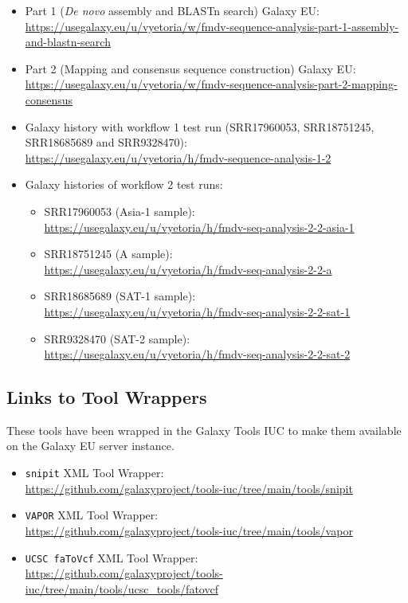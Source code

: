 \begin{itemize}
	\setlength{\itemsep}{-0.4cm}
	\item Part 1 (\textit{De novo} assembly and BLASTn search) Galaxy EU:\\
	\url{https://usegalaxy.eu/u/vyetoria/w/fmdv-sequence-analysis-part-1-assembly-and-blastn-search}
	\item Part 2 (Mapping and consensus sequence construction) Galaxy EU:\\
	\url{https://usegalaxy.eu/u/vyetoria/w/fmdv-sequence-analysis-part-2-mapping-consensus}
	\item Galaxy history with workflow 1 test run (SRR17960053, SRR18751245, SRR18685689 and SRR9328470):\\
	\url{https://usegalaxy.eu/u/vyetoria/h/fmdv-sequence-analysis-1-2}
	\newpage
	\item Galaxy histories of workflow 2 test runs:
	\begin{itemize}
		\setlength{\itemsep}{-0.4cm}
		\vspace*{-0.4cm}
		\item SRR17960053 (Asia-1 sample):\\
		\url{https://usegalaxy.eu/u/vyetoria/h/fmdv-seq-analysis-2-2-asia-1}
		\item SRR18751245 (A sample):\\
		\url{https://usegalaxy.eu/u/vyetoria/h/fmdv-seq-analysis-2-2-a}
		\item SRR18685689 (SAT-1 sample):\\
		\url{https://usegalaxy.eu/u/vyetoria/h/fmdv-seq-analysis-2-2-sat-1}
		\item SRR9328470 (SAT-2 sample):\\
		\url{https://usegalaxy.eu/u/vyetoria/h/fmdv-seq-analysis-2-2-sat-2}
	\end{itemize}
\end{itemize}

\subsection*{\thesubsection \quad Links to Tool Wrappers}
\label{sec:apx-wrap-links}

These tools have been wrapped in the Galaxy Tools IUC to make them available on the Galaxy EU server instance.

\begin{itemize}
	\setlength{\itemsep}{-0.4cm}
	\item \texttt{snipit} XML Tool Wrapper:\\
	\url{https://github.com/galaxyproject/tools-iuc/tree/main/tools/snipit}
	\item \texttt{VAPOR} XML Tool Wrapper:\\
	\url{https://github.com/galaxyproject/tools-iuc/tree/main/tools/vapor}
	\item \texttt{UCSC faToVcf} XML Tool Wrapper:\\
	\url{https://github.com/galaxyproject/tools-iuc/tree/main/tools/ucsc_tools/fatovcf}
\end{itemize}

